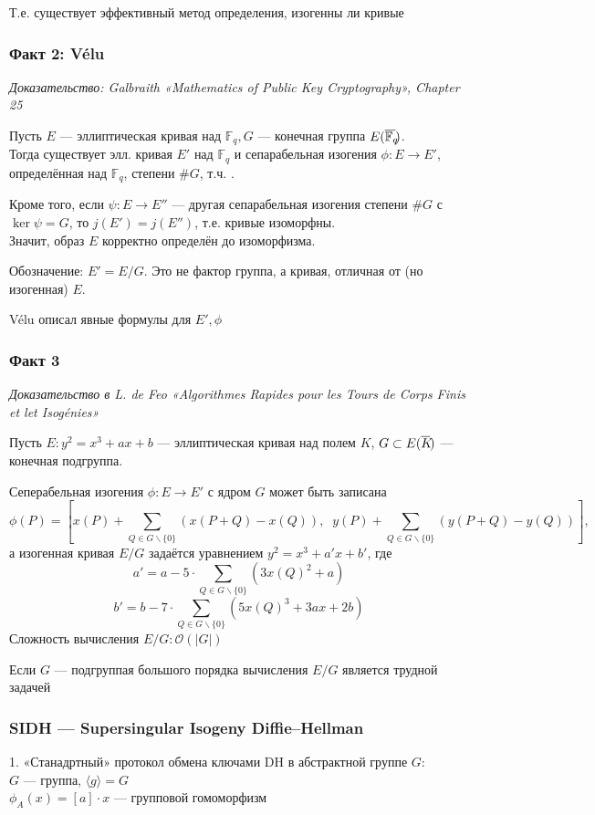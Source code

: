 \documentclass[12pt, final]{article}
\newcommand{\F}{{{\mathbb F}}}
\newcommand{\bigO}{\mathcal{O}}
\newcommand{\overbar}[1]{\overline{\mkern-0.0mu#1\mkern-4.0mu}}
\theoremstyle{definition}
\theoremstyle{definition}
\theoremstyle{definition}
\begin{document}
Т.е. существует эффективный метод определения, изогенны ли кривые

\subsubsection{Факт 2: Vélu}
\textit{Доказательство: Galbraith «Mathematics of Public Key Cryptography», Chapter 25}

Пусть $E$ — эллиптическая кривая над $\F_q, G$ — конечная группа $E(\overbar{\F_q})$.\\
Тогда существует элл. кривая $E'$ над $\F_q$ и сепарабельная изогения $\phi: E \rightarrow E' $, определённая над $\F_q$, степени $\#G$, т.ч. .

Кроме того, если $\psi: E \rightarrow E''$ — другая сепарабельная изогения степени $\#G$ с $\ker\psi = G$, то $j(E')=j(E'')$, т.е. кривые изоморфны.\\
Значит, образ $E$ корректно определён до изоморфизма.

Обозначение: $E' = E/G$. Это не фактор группа, а кривая, отличная от (но изогенная) $E$.

Vélu описал явные формулы для $E', \phi$

\subsubsection{Факт 3}
\textit{Доказательство в L. de Feo «Algorithmes Rapides pour les Tours de Corps Finis et let Isogénies»}

Пусть $E: y^2 = x^3 + ax + b$ — эллиптическая кривая над полем $K$,\; $G \subset E(\overbar{K})$ — конечная подгруппа.

Сеперабельная изогения $\phi: E \rightarrow E'$ с ядром $G$ может быть записана 
\[
    \phi(P) = [x(P) + \sum_{Q\in G \backslash \{0\}} (x(P+Q) - x(Q)),\;\; y(P) + \sum_{Q\in G \backslash \{0\}}(y(P+Q) - y(Q))],
\]
а изогенная кривая $E/G$ задаётся уравнением $y^2 = x^3 + a'x+b'$, где 
\[
    a' = a - 5\cdot \sum_{Q\in G \backslash \{0\}} (3 x(Q)^2 + a)
\]
\[
    b' = b - 7\cdot \sum_{Q\in G \backslash \{0\}}(5x(Q)^3 + 3ax + 2b)
\]
Сложность вычисления $E/G: \bigO(|G|)$

Если $G$ — подгруппая большого порядка вычисления $E/G$ является трудной задачей

\subsubsection{SIDH — Supersingular Isogeny Diffie--Hellman}
1. «Станадртный» протокол обмена ключами DH в абстрактной группе $G$: \\ 
$G$ — группа, $\langle g\rangle = G$\\
$\phi_A(x) = [a]\cdot x$ — групповой гомоморфизм
\end{document}
